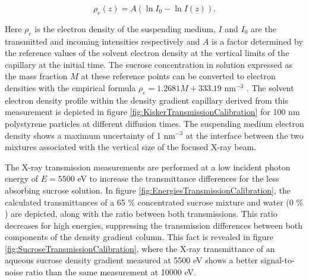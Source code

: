 \begin{equation}
  \rho_e(z) = A \left( \ln{I_0} - \ln{I(z)} \right) .
\end{equation}

Here \(\rho_e\) is the electron density of the suspending medium, $I$ and $I_0$ are the transmitted and incoming intensities respectively and $A$ is a factor determined by the reference values of the solvent electron density at the vertical limits of the capillary at the initial time. The sucrose concentration in solution expressed as the mass fraction \( M \) at these reference points can be converted to electron densities with the empirical formula \( \rho_e=1.2681M+333.19 \) nm\(^{-3}\) \citep{haynes_crc_2012}. The solvent electron density profile within the density gradient capillary derived from this measurement is depicted in figure \ref{fig:KiskerTransmissionCalibration} for 100 nm polystyrene particles at different diffusion times. The suspending medium electron density shows a maximum uncertainty of 1 nm$^{-3}$ at the interface between the two mixtures associated with the vertical size of the focused X-ray beam.

\begin{figure*}%
	\centering
		
		\caption[Calibration of the solvent electron density by X-ray transmission.]{Solvent density along the gradient capillary vertical axis at different diffusion times, calculated from the transmission measurements at 5500 eV of 100 nm polystyrene particles. The corresponding X-ray transmission is shown on the right axis, revealing the low transmittances of the filled capillary at low energies.}
		\label{fig:KiskerTransmissionCalibration}
\end{figure*}

The X-ray transmission measurements are performed at a low incident photon energy of $E = 5500$ eV to increase the transmittance differences for the less absorbing sucrose solution. In figure \ref{fig:EnergiesTransmissionCalibration}, the calculated transmittances of a 65 $\%$ concentrated sucrose mixture and water (0 $\%$) are depicted, along with the ratio between both transmissions. This ratio decreases for high energies, suppressing the transmission differences between both components of the density gradient column. This fact is revealed in figure \ref{fig:SucroseTransmissionCalibration}, where the X-ray transmittance of an aqueous sucrose density gradient measured at 5500 eV shows a better signal-to-noise ratio than the same measurement at 10000 eV.

